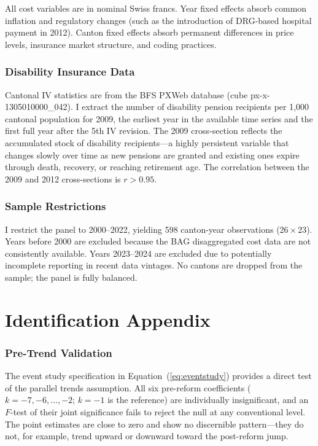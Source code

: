 \documentclass[12pt]{article}
\begin{document}
All cost variables are in nominal Swiss francs. Year fixed effects absorb common inflation and regulatory changes (such as the introduction of DRG-based hospital payment in 2012). Canton fixed effects absorb permanent differences in price levels, insurance market structure, and coding practices.

\subsubsection*{Disability Insurance Data} Cantonal IV statistics are from the BFS PXWeb database (cube px-x-1305010000\_042). I extract the number of disability pension recipients per 1,000 cantonal population for 2009, the earliest year in the available time series and the first full year after the 5th IV revision. The 2009 cross-section reflects the accumulated stock of disability recipients---a highly persistent variable that changes slowly over time as new pensions are granted and existing ones expire through death, recovery, or reaching retirement age. The correlation between the 2009 and 2012 cross-sections is $r > 0.95$.

\subsubsection*{Sample Restrictions} I restrict the panel to 2000--2022, yielding 598 canton-year observations ($26 \times 23$). Years before 2000 are excluded because the BAG disaggregated cost data are not consistently available. Years 2023--2024 are excluded due to potentially incomplete reporting in recent data vintages. No cantons are dropped from the sample; the panel is fully balanced.

\section{Identification Appendix}
\label{app:identification}

\subsubsection*{Pre-Trend Validation} The event study specification in Equation~(\ref{eq:eventstudy}) provides a direct test of the parallel trends assumption. All six pre-reform coefficients ($k = -7, -6, \ldots, -2$; $k = -1$ is the reference) are individually insignificant, and an $F$-test of their joint significance fails to reject the null at any conventional level. The point estimates are close to zero and show no discernible pattern---they do not, for example, trend upward or downward toward the post-reform jump.
\end{document}

